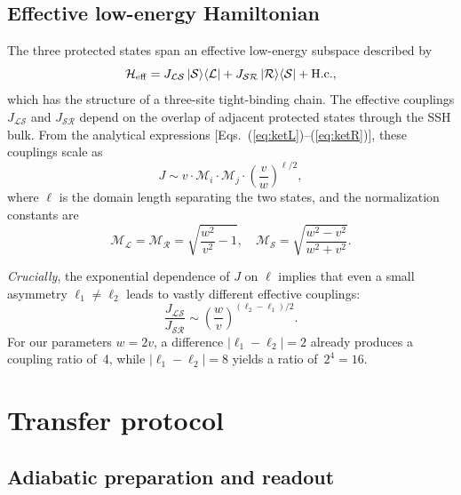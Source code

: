 \documentclass[
  reprint,
  amsmath,
  amssymb,
  aps,
  prb,
  longbibliography,
]{revtex4-2}
\newcommand{\Heff}{\mathcal{H}_{\mathrm{eff}}}
\newcommand{\JLS}{J_{\mathcal{LS}}}
\newcommand{\JSR}{J_{\mathcal{SR}}}
\newcommand{\ketS}{\ket{\mathcal{S}}}
\newcommand{\ketR}{\ket{\mathcal{R}}}
\begin{document}
\subsection{Effective low-energy Hamiltonian}
\label{sec:heff}

The three protected states span an effective low-energy subspace described by
\begin{equation}
  \Heff = \JLS \ketS\!\bra{\mathcal{L}} + \JSR \ketR\!\bra{\mathcal{S}} + \text{H.c.},
  \label{eq:heff}
\end{equation}
which has the structure of a three-site tight-binding chain. The effective couplings
$\JLS$ and $\JSR$ depend on the overlap of adjacent protected states through the
SSH bulk. From the analytical expressions [Eqs.~(\ref{eq:ketL})--(\ref{eq:ketR})],
these couplings scale as~\cite{Zurita2023}
\begin{equation}
  J \sim v \cdot \mathcal{M}_i \cdot \mathcal{M}_j \cdot
  \left(\frac{v}{w}\right)^{\!\ell/2},
  \label{eq:coupling_scaling}
\end{equation}
where $\ell$ is the domain length separating the two states, and the normalization
constants are
\begin{equation}
  \mathcal{M}_{\mathcal{L}} = \mathcal{M}_{\mathcal{R}} =
  \sqrt{\frac{w^2}{v^2} - 1},
  \quad
  \mathcal{M}_{\mathcal{S}} = \sqrt{\frac{w^2 - v^2}{w^2 + v^2}}.
  \label{eq:normalization}
\end{equation}

\emph{Crucially}, the exponential dependence of $J$ on $\ell$ implies that even
a small asymmetry $\ell_1 \neq \ell_2$ leads to vastly different effective
couplings:
\begin{equation}
  \frac{\JLS}{\JSR} \sim
  \left(\frac{w}{v}\right)^{\!(\ell_2 - \ell_1)/2}.
  \label{eq:coupling_ratio}
\end{equation}
For our parameters $w = 2v$, a difference $|\ell_1 - \ell_2| = 2$ already produces
a coupling ratio of~4, while $|\ell_1 - \ell_2| = 8$ yields a ratio of~$2^4 = 16$.

\section{Transfer protocol}
\label{sec:transfer}

\subsection{Adiabatic preparation and readout}
\label{sec:protocol}
\end{document}
